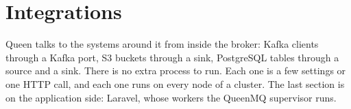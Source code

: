 
\chapter{Integrations}

Queen talks to the systems around it from inside the broker: Kafka clients through a Kafka port,
S3 buckets through a sink, PostgreSQL tables through a source and a sink. There is no extra process
to run. Each one is a few settings or one HTTP call, and each one runs on every node of a cluster.
The last section is on the application side: Laravel, whose workers the QueenMQ supervisor runs.





